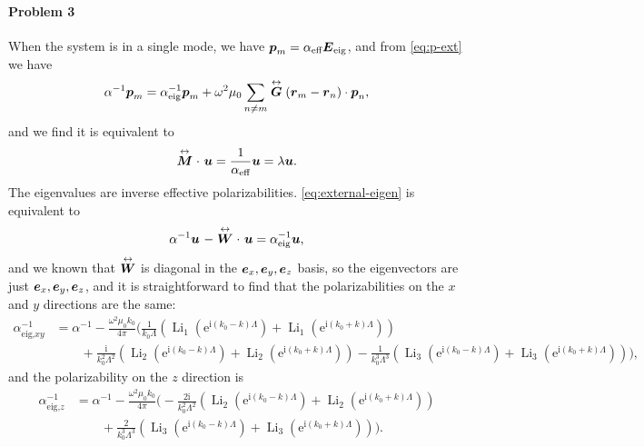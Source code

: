 \documentclass[hyperref, a4paper]{article}
\newcommand*{\ii}{\mathrm{i}}
\newcommand*{\ee}{\mathrm{e}}
\DeclareMathOperator{\li}{Li}
\renewcommand{\tensor}[1]{ \stackrel{\leftrightarrow}{\vb*{#1}}}
\begin{document}
\paragraph{Problem 3} When the system is in a single mode, we have $\vb*{p}_m = \alpha_\text{eff} 
\vb*{E}_\text{eig}$, and from \eqref{eq:p-ext} we have 
\[
    \alpha^{-1} \vb*{p}_m = \alpha_\text{eig}^{-1} \vb*{p}_m + \omega^2 \mu_0 \sum_{n \neq m} \tensor{\vb*{G}}(\vb*{r}_m - \vb*{r}_n) \cdot \vb*{p}_n,
\]
and we find it is equivalent to 
\begin{equation}
    \tensor{\vb*{M}} \cdot \ \vb*{u} = \frac{1}{\alpha_\text{eff}} \vb*{u} = \lambda \vb*{u}.
    \label{eq:external-eigen}
\end{equation}
The eigenvalues are inverse effective polarizabilities. \eqref{eq:external-eigen} is equivalent to 
\[
    \alpha^{-1} \vb*{u} \ - \tensor{\vb*{W}} \cdot \ \vb*{u} = \alpha_\text{eig}^{-1} \vb*{u},
\]
and we known that $\tensor{\vb*{W}}$ is diagonal in the $\vb*{e}_x, \vb*{e}_y, \vb*{e}_z$ basis, so the
eigenvectors are just $\vb*{e}_x, \vb*{e}_y, \vb*{e}_z$, and it is straightforward to find that the 
polarizabilities on the $x$ and $y$ directions are the same: 
\begin{equation}
    \begin{aligned}
        \alpha_\text{eig,$xy$}^{-1} &= \alpha^{-1} - \frac{\omega^2 \mu_0 k_0}{4 \pi} \biggl( \frac{1}{k_0 \Lambda} (\li_1(\ee^{\ii (k_0 - k) \Lambda}) + \li_1(\ee^{\ii (k_0 + k) \Lambda})) \\
        &\quad \quad + \frac{\ii}{k_0^2 \Lambda^2} (\li_2(\ee^{\ii (k_0 - k) \Lambda}) + \li_2(\ee^{\ii (k_0 + k) \Lambda})) - \frac{1}{k_0^3 \Lambda^3} (\li_3(\ee^{\ii (k_0 - k) \Lambda}) + \li_3(\ee^{\ii (k_0 + k) \Lambda})) \biggr),
    \end{aligned}
    \label{eq:alpha-xy}
\end{equation}
and the polarizability on the $z$ direction is 
\begin{equation}
    \begin{aligned}
        \alpha_\text{eig,$z$}^{-1} &= \alpha^{-1} - \frac{\omega^2 \mu_0 k_0}{4 \pi} \biggl( - \frac{2\ii}{k_0^2 \Lambda^2} (\li_2(\ee^{\ii (k_0 - k) \Lambda}) + \li_2(\ee^{\ii (k_0 + k) \Lambda})) \\
        &\quad \quad  + \frac{2}{k_0^3 \Lambda^3} (\li_3(\ee^{\ii (k_0 - k) \Lambda}) + \li_3(\ee^{\ii (k_0 + k) \Lambda})) \biggr).
    \end{aligned}
    \label{eq:alpha-z}
\end{equation}
\end{document}
